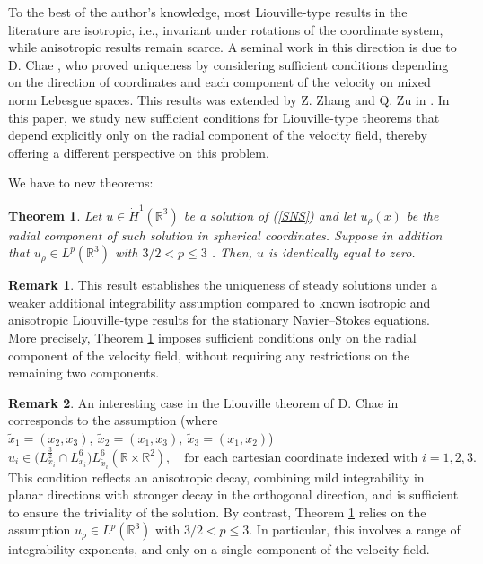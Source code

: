 \documentclass[a4paper,12pt]{amsart}
\theoremstyle{definition}
\newtheorem{remark}{Remark}[section]
\theoremstyle{plain}
\newtheorem{theorem}{Theorem}[section]
\def\vu{ u }
\begin{document}
To the best of the author’s knowledge, most Liouville-type results in the literature are isotropic, i.e., invariant under rotations of the coordinate system, while anisotropic results remain scarce. A seminal work in this  direction is due to D. Chae \cite{Chae23}, who proved uniqueness by considering sufficient conditions depending on the direction of coordinates and each component of the velocity on mixed norm Lebesgue spaces. This results was extended by Z. Zhang and Q. Zu in \cite{ZZ25}. 
In this paper, we study new sufficient conditions for Liouville-type theorems that depend explicitly only on  the radial component of the velocity field, thereby offering a different perspective on this problem.
 
We have to new theorems:
 \begin{theorem}\label{thm1} 
 Let $\vu  \in \dot{H}^1(\mathbb{R}^3) $ be a solution of (\ref{SNS})
 and let $u_\rho(x)$ be the radial component of such solution in spherical coordinates. 
 Suppose in addition that
 $u_\rho \in L^{p}(\mathbb{R}^3)$ with $3/2<p\leq 3$ .
 Then, $u $ is identically equal to zero.
\end{theorem}

\begin{remark}
This result establishes the uniqueness of steady solutions under a weaker additional integrability assumption compared to known isotropic and anisotropic Liouville-type results for the stationary Navier--Stokes equations. 
More precisely, Theorem \ref{thm1} imposes sufficient conditions only on the radial component of the velocity field, without requiring any restrictions on the remaining two components.
\end{remark}

\begin{remark}
An interesting case in the Liouville theorem of D. Chae in \cite{Chae23} corresponds to the assumption (where 
$\tilde x_1 = (x_2, x_3), \ \tilde x_2= (x_1, x_3), \ \tilde x_3 = (x_1, x_2)$) 
\[
u_i \in \big(L_{x_i}^{\frac{3}{2}} \cap L_{x_i}^{6}\big) L_{\tilde x_i}^{6}(\mathbb{R} \times \mathbb{R}^2), 
\quad \text{for each cartesian coordinate indexed with } i = 1,2,3.
\]
This condition reflects an anisotropic decay, combining  mild integrability 
in planar directions with stronger decay in the orthogonal direction, and is sufficient 
to ensure the triviality of the solution.
By contrast, Theorem \ref{thm1} relies on the assumption 
$u_\rho \in L^{p}(\mathbb{R}^3)$ with $3/2 < p \leq 3$. In particular, this involves 
a range of integrability exponents, and only on a single component 
of the velocity field. 
\end{remark}
\end{document}
